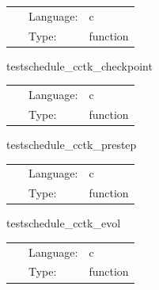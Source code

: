  \begin{tabular*}{160mm}{cll} 
~ & Language:  & c \\ 
~ & Type:  & function \\ 
\end{tabular*} 


\vspace{5mm}


\hspace{5mm} testschedule\_cctk\_checkpoint 

\hspace{5mm}{\it test to see if function is placed in schedule and run at cctk\_checkpoint } 


\hspace{5mm}

 \begin{tabular*}{160mm}{cll} 
~ & Language:  & c \\ 
~ & Type:  & function \\ 
\end{tabular*} 


\vspace{5mm}


\hspace{5mm} testschedule\_cctk\_prestep 

\hspace{5mm}{\it test to see if function is placed in schedule and run at cctk\_prestep } 


\hspace{5mm}

 \begin{tabular*}{160mm}{cll} 
~ & Language:  & c \\ 
~ & Type:  & function \\ 
\end{tabular*} 


\vspace{5mm}


\hspace{5mm} testschedule\_cctk\_evol 

\hspace{5mm}{\it test to see if function is placed in schedule and run at cctk\_evol } 


\hspace{5mm}

 \begin{tabular*}{160mm}{cll} 
~ & Language:  & c \\ 
~ & Type:  & function \\ 
\end{tabular*} 


